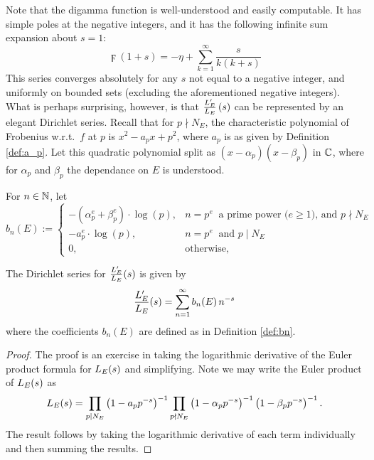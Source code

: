 Note that the digamma function is well-understood and easily computable. It has simple poles at the negative integers, and it has the following infinite sum expansion about $s=1$:
\begin{equation}\label{eqn:digamma_sum}
\digamma(1+s) = -\eta + \sum_{k=1}^{\infty} \frac{s}{k(k+s)}
\end{equation}
This series converges absolutely for any $s$ not equal to a negative integer, and uniformly on bounded sets (excluding the aforementioned negative integers).\\

What is perhaps surprising, however, is that $\frac{L_E^{\prime}}{L_E}\left(s\right)$ can be represented by an elegant Dirichlet series. Recall that for $p \nmid N_E$, the characteristic polynomial of Frobenius w.r.t.~$f$ at $p$ is $x^2 - a_p x + p^2$, where $a_p$ is as given by Definition \ref{def:a_p}. Let this quadratic polynomial split as $(x-\alpha_p)(x-\beta_p)$ in $\mathbb{C}$, where for $\alpha_p$ and $\beta_p$ the dependance on $E$ is understood. \\

\begin{definition}\label{def:bn}
For $n \in \mathbb{N}$, let
\begin{equation}
b_n(E) := \begin{cases}
-\left(\alpha_p^e+\beta_p^e\right)\cdot \log(p), & n=p^e\;\;\text{a prime power ($e\ge1$), and $p \nmid N_E$} \\
-a_p^e \cdot \log(p), & n=p^e\;\;\text{and $p \mid N_E$} \\
0, & \text{otherwise,} \end{cases}
\end{equation}
\end{definition}

\begin{lemma}
The Dirichlet series for $\frac{L_E^{\prime}}{L_E}(s)$ is given by
\begin{equation}
\frac{L_E^{\prime}}{L_E}(s) = \sum_{n=1}^{\infty} b_n(E)\, n^{-s}
\end{equation}
where the coefficients $b_n(E)$ are defined as in Definition \ref{def:bn}. \\
\end{lemma}
\begin{proof}
The proof is an exercise in taking the logarithmic derivative of the Euler product formula for $L_E(s)$ and simplifying. Note we may write the Euler product of $L_E(s)$ as
\begin{equation}
L_E(s) = \prod_{p|N_E} \left(1-a_p p^{-s}\right)^{-1} \prod_{p\nmid N_E} \left(1-\alpha_p p^{-s}\right)^{-1}\left(1-\beta_p p^{-s}\right)^{-1}.
\end{equation}
The result follows by taking the logarithmic derivative of each term individually and then summing the results.
\end{proof}

